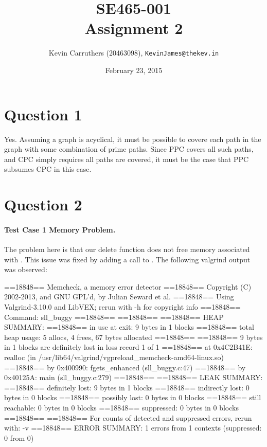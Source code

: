 \documentclass[12pt]{article}
\title{SE465-001\\Assignment 2}
\author{Kevin Carruthers (20463098), {\tt KevinJames@thekev.in}}
\date{February 23, 2015}
\begin{document}
\maketitle

\section*{Question 1}
Yes. Assuming a graph is acyclical, it must be possible to covere each path in the graph with some combination of prime paths. Since PPC covers all such paths, and CPC simply requires all paths are covered, it must be the case that PPC subsumes CPC in this case.

\section*{Question 2}
\paragraph{Test Case 1 Memory Problem.} The problem here is that our delete function does not free memory associated with \rmfamily{}. This issue was fixed by adding a call to \rmfamily{}. The following valgrind output was observed:
\begin{verbnobox}[\scriptsize]
==18848== Memcheck, a memory error detector
==18848== Copyright (C) 2002-2013, and GNU GPL'd, by Julian Seward et al.
==18848== Using Valgrind-3.10.0 and LibVEX; rerun with -h for copyright info
==18848== Command: sll_buggy
==18848==
==18848==
==18848== HEAP SUMMARY:
==18848==     in use at exit: 9 bytes in 1 blocks
==18848==   total heap usage: 5 allocs, 4 frees, 67 bytes allocated
==18848==
==18848== 9 bytes in 1 blocks are definitely lost in loss record 1 of 1
==18848==    at 0x4C2B41E: realloc (in /usr/lib64/valgrind/vgpreload_memcheck-amd64-linux.so)
==18848==    by 0x400990: fgets_enhanced (sll_buggy.c:47)
==18848==    by 0x40125A: main (sll_buggy.c:279)
==18848==
==18848== LEAK SUMMARY:
==18848==    definitely lost: 9 bytes in 1 blocks
==18848==    indirectly lost: 0 bytes in 0 blocks
==18848==      possibly lost: 0 bytes in 0 blocks
==18848==    still reachable: 0 bytes in 0 blocks
==18848==         suppressed: 0 bytes in 0 blocks
==18848==
==18848== For counts of detected and suppressed errors, rerun with: -v
==18848== ERROR SUMMARY: 1 errors from 1 contexts (suppressed: 0 from 0)
\end{verbnobox}
\end{document}
